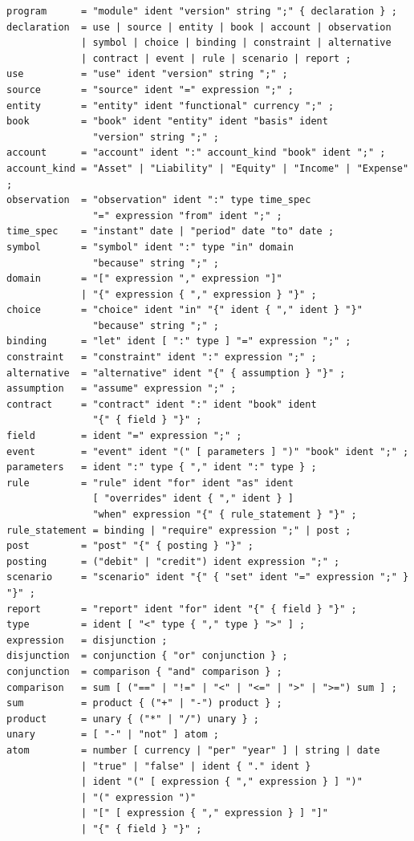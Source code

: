 \begin{lstlisting}
program      = "module" ident "version" string ";" { declaration } ;
declaration  = use | source | entity | book | account | observation
             | symbol | choice | binding | constraint | alternative
             | contract | event | rule | scenario | report ;
use          = "use" ident "version" string ";" ;
source       = "source" ident "=" expression ";" ;
entity       = "entity" ident "functional" currency ";" ;
book         = "book" ident "entity" ident "basis" ident
               "version" string ";" ;
account      = "account" ident ":" account_kind "book" ident ";" ;
account_kind = "Asset" | "Liability" | "Equity" | "Income" | "Expense" ;
observation  = "observation" ident ":" type time_spec
               "=" expression "from" ident ";" ;
time_spec    = "instant" date | "period" date "to" date ;
symbol       = "symbol" ident ":" type "in" domain
               "because" string ";" ;
domain       = "[" expression "," expression "]"
             | "{" expression { "," expression } "}" ;
choice       = "choice" ident "in" "{" ident { "," ident } "}"
               "because" string ";" ;
binding      = "let" ident [ ":" type ] "=" expression ";" ;
constraint   = "constraint" ident ":" expression ";" ;
alternative  = "alternative" ident "{" { assumption } "}" ;
assumption   = "assume" expression ";" ;
contract     = "contract" ident ":" ident "book" ident
               "{" { field } "}" ;
field        = ident "=" expression ";" ;
event        = "event" ident "(" [ parameters ] ")" "book" ident ";" ;
parameters   = ident ":" type { "," ident ":" type } ;
rule         = "rule" ident "for" ident "as" ident
               [ "overrides" ident { "," ident } ]
               "when" expression "{" { rule_statement } "}" ;
rule_statement = binding | "require" expression ";" | post ;
post         = "post" "{" { posting } "}" ;
posting      = ("debit" | "credit") ident expression ";" ;
scenario     = "scenario" ident "{" { "set" ident "=" expression ";" } "}" ;
report       = "report" ident "for" ident "{" { field } "}" ;
type         = ident [ "<" type { "," type } ">" ] ;
expression   = disjunction ;
disjunction  = conjunction { "or" conjunction } ;
conjunction  = comparison { "and" comparison } ;
comparison   = sum [ ("==" | "!=" | "<" | "<=" | ">" | ">=") sum ] ;
sum          = product { ("+" | "-") product } ;
product      = unary { ("*" | "/") unary } ;
unary        = [ "-" | "not" ] atom ;
atom         = number [ currency | "per" "year" ] | string | date
             | "true" | "false" | ident { "." ident }
             | ident "(" [ expression { "," expression } ] ")"
             | "(" expression ")"
             | "[" [ expression { "," expression } ] "]"
             | "{" { field } "}" ;
\end{lstlisting}

